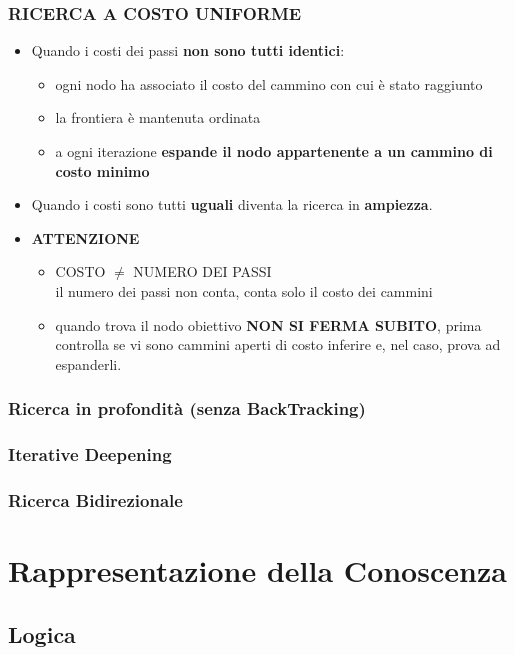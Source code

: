 \documentclass[14pt]{extarticle}
\begin{document}
\subsubsection{RICERCA A COSTO UNIFORME}
\begin{itemize}
    \item Quando i costi dei passi \textbf{non sono tutti identici}:
        \begin{itemize}
            \item ogni nodo ha associato il costo del cammino con cui è stato raggiunto
            \item la frontiera è mantenuta ordinata
            \item a ogni iterazione \textbf{espande il nodo appartenente a un cammino di costo minimo}
        \end{itemize}
    \item Quando i costi sono tutti \textbf{uguali} diventa la ricerca in \textbf{ampiezza}.
    \item \textbf{ATTENZIONE}
    \begin{itemize}
        \item COSTO $\neq$ NUMERO DEI PASSI\\il numero dei passi non conta, conta solo il costo dei cammini
        \item quando trova il nodo obiettivo \textbf{NON SI FERMA SUBITO}, prima controlla se vi sono cammini aperti di costo inferire e, nel caso, prova ad espanderli.
    \end{itemize}
\end{itemize}
\subsubsection{Ricerca in profondità (senza BackTracking)}
\subsubsection{Iterative Deepening}
\subsubsection{Ricerca Bidirezionale}

\section{Rappresentazione della Conoscenza}
\subsection{Logica}
\end{document}
